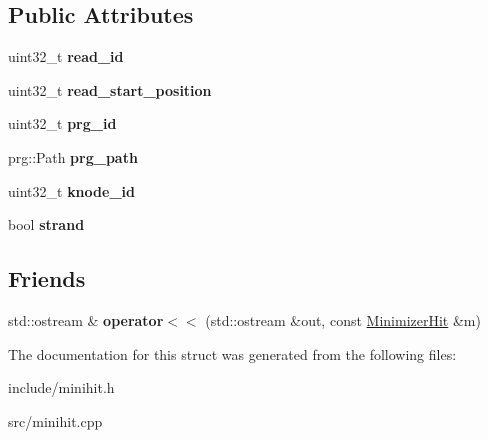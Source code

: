 \subsection*{Public Attributes}
\begin{DoxyCompactItemize}
\item 
\mbox{\label{structMinimizerHit_a4be91f378dd1ecf3fa6524fc66a06834}} 
uint32\+\_\+t {\bfseries read\+\_\+id}
\item 
\mbox{\label{structMinimizerHit_ac71537bc57caef0dc26da9d02c1dfc7d}} 
uint32\+\_\+t {\bfseries read\+\_\+start\+\_\+position}
\item 
\mbox{\label{structMinimizerHit_aafb1dc2d20eaa1c590c5cd53fa1193dc}} 
uint32\+\_\+t {\bfseries prg\+\_\+id}
\item 
\mbox{\label{structMinimizerHit_a7bb0a2cc7a47c4dded7e807b5b69e4bf}} 
prg\+::\+Path {\bfseries prg\+\_\+path}
\item 
\mbox{\label{structMinimizerHit_aa1682626b80f6376844d97f1a9c19816}} 
uint32\+\_\+t {\bfseries knode\+\_\+id}
\item 
\mbox{\label{structMinimizerHit_a0743c359476e41278b084dbe8a24b9c1}} 
bool {\bfseries strand}
\end{DoxyCompactItemize}
\subsection*{Friends}
\begin{DoxyCompactItemize}
\item 
\mbox{\label{structMinimizerHit_ad6546ef24569abacf9851ff95f68c498}} 
std\+::ostream \& {\bfseries operator$<$$<$} (std\+::ostream \&out, const \hyperlink{structMinimizerHit}{Minimizer\+Hit} \&m)
\end{DoxyCompactItemize}


The documentation for this struct was generated from the following files\+:\begin{DoxyCompactItemize}
\item 
include/minihit.\+h\item 
src/minihit.\+cpp\end{DoxyCompactItemize}
